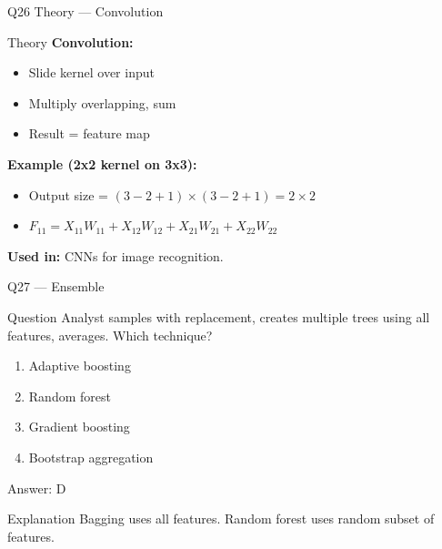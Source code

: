 \documentclass[aspectratio=169,8pt]{beamer}
\begin{document}
	\begin{frame}{Q26 Theory --- Convolution}
		\begin{block}{Theory}
			\textbf{Convolution:}
			\begin{itemize}
				\item Slide kernel over input
				\item Multiply overlapping, sum
				\item Result = feature map
			\end{itemize}
			\textbf{Example (2x2 kernel on 3x3):}
			\begin{itemize}
				\item Output size = $(3-2+1) \times (3-2+1) = 2 \times 2$
				\item $F_{11} = X_{11}W_{11} + X_{12}W_{12} + X_{21}W_{21} + X_{22}W_{22}$
			\end{itemize}
			\textbf{Used in:} CNNs for image recognition.
		\end{block}
	\end{frame}
	
	\begin{frame}{Q27 --- Ensemble}
		\begin{block}{Question}
			Analyst samples with replacement, creates multiple trees using all features, averages. Which technique?
		\end{block}
		\begin{enumerate}[label=\Alph*.]
			\item Adaptive boosting
			\item Random forest
			\item Gradient boosting
			\item Bootstrap aggregation
		\end{enumerate}
		\begin{exampleblock}{Answer: D}
		\end{exampleblock}
		\begin{block}{Explanation}
			Bagging uses all features. Random forest uses random subset of features.
		\end{block}
	\end{frame}
	
\end{document}
